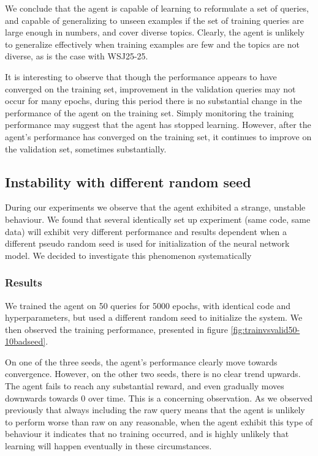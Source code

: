 We conclude that the agent is capable of learning to reformulate a set of queries, and capable of generalizing to unseen examples if the set of training queries are large enough in numbers, and cover diverse topics. Clearly, the agent is unlikely to generalize effectively when training examples are few and the topics are not diverse, as is the case with WSJ25-25. 

It is interesting to observe that though the performance appears to have converged on the training set, improvement in the validation queries may not occur for many epochs, during this period there is no substantial change in the performance of the agent on the training set. Simply monitoring the training performance may suggest that the agent has stopped learning. However, after the agent's performance has converged on the training set, it continues to improve on the validation set, sometimes substantially.





\subsection{Instability with different random seed}

During our experiments we observe that the agent exhibited a strange, unstable behaviour. We found that several identically set up experiment (same code, same data) will exhibit very different performance and results dependent when a different pseudo random seed is used for initialization of the neural network model. We decided to investigate this phenomenon systematically 


\subsubsection{Results}

We trained the agent on 50 queries for 5000 epochs, with identical code and hyperparameters, but used a different random seed to initialize the system. We then observed the training performance,  presented in figure \ref{fig:trainvsvalid50-10badseed}. 

On one of the three seeds, the agent's performance clearly move towards convergence. However, on the other two seeds, there is no clear trend upwards. The agent fails to reach any substantial reward, and even gradually moves downwards towards 0 over time. This is a concerning observation. As we observed previously that always including the raw query means that the agent is unlikely to perform worse than raw on any reasonable, when the agent exhibit this type of behaviour it indicates that no training occurred, and is highly unlikely that learning will happen eventually in these circumstances. 



